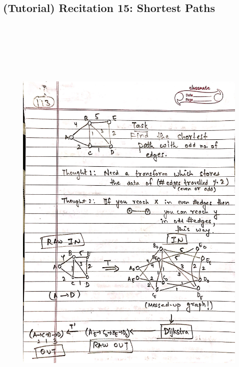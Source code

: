 \newpage
{\color{black} \subsection*{(Tutorial) Recitation 15: Shortest Paths}}
\begin{figure}[H]
    \centering
    \includegraphics[width=16cm, height=21cm]{"./MIT-6.006/MIT-6006-113"}
\end{figure}

